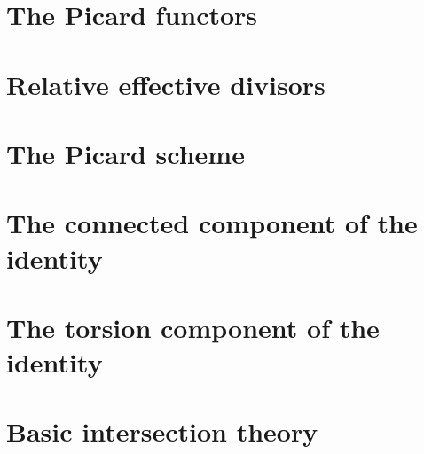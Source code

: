 \documentclass[11pt]{report}
\begin{document}
\chapter{The Picard functors}

\chapter{Relative effective divisors}

\chapter{The Picard scheme}

\chapter{The connected component of the identity}

\chapter{The torsion component of the identity}

\appendix
\setcounter{chapter}{1}
\chapter{Basic intersection theory}

\end{document}

